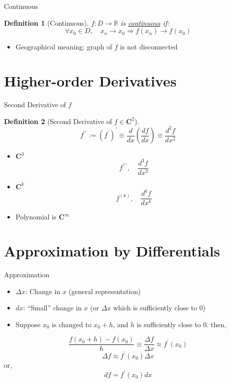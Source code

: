 \documentclass[final]{beamer}
\newtheorem{defn}{Definition}
\begin{document}
\begin{frame}[t]{Continuous}
	\begin{defn}
		[Continuous]
		$f:D\rightarrow \mathbb{R}$ is \uline{continuous} if:\[
			\forall x_0 \in D,\quad x_n \rightarrow x_0 \Rightarrow f(x_n)\rightarrow f(x_0)
		\]
	\end{defn}
	\begin{itemize}
		\item Geographical meaning: graph of $f$ is not disconnected
	\end{itemize}
\end{frame}


\section{Higher-order Derivatives} %
\label{sec:higher_order_derivatives}

\begin{frame}[t]{Second Derivative of $f$}
	\begin{defn}
		[Second Derivative of $f\in \mathbf{C}^2$]
		\[
			f^{\prime\prime} := (f^\prime)^\prime \equiv \frac{d}{dx}\left(\frac{df}{dx}\right) \equiv \frac{d^2f}{dx^2}
		\]
	\end{defn}
	\begin{itemize}
		\item $\mathbf{C}^3$
		\[
			f^{\prime\prime\prime},\quad \frac{d^3f}{dx^3}
		\]
		\item $\mathbf{C}^k$
		\[
			f^{(k)},\quad \frac{d^kf}{dx^k}
		\]
		\item Polynomial is $\mathbf{C}^\infty$
	\end{itemize}
\end{frame}

\section{Approximation by Differentials} %
\label{sec:approximation_by_differentials}


\begin{frame}[t]{Approximation}
	\begin{itemize}
		\item $\Delta x$: Change in $x$ (general representation)
		\item $dx$: ``Small'' change in $x$ (or $\Delta x$ which is sufficiently close to 0)
		\item Suppose $x_0$ is changed to $x_0+h$, and $h$ is sufficiently close to 0. then, 
	\end{itemize}
	\[
		\frac{f(x_0+h)-f(x_0)}{h}\equiv \frac{\Delta f}{\Delta x} \approx f^\prime (x_0)
	\]
	\[
		\Delta f \approx f^\prime (x_0) \Delta x
	\] or, \[
		df = f^\prime (x_0) dx
	\]
\end{frame}
\end{document}
